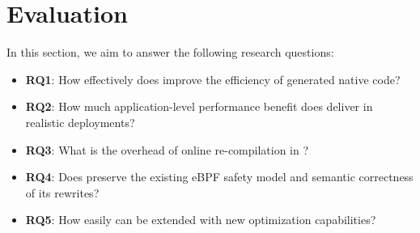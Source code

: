 










\section{Evaluation }
\label{sec:evaluation}

In this section, we aim to answer the following research questions:
\begin{itemize}
    \item \textbf{RQ1}: How effectively does \tool improve the efficiency of generated native code?
    \item \textbf{RQ2}: How much application-level performance benefit does \tool deliver in realistic deployments?
    \item \textbf{RQ3}: What is the overhead of online re-compilation in \tool?
    \item \textbf{RQ4}: Does \tool preserve the existing eBPF safety model and semantic correctness of its rewrites?
    \item \textbf{RQ5}: How easily can \tool be extended with new optimization capabilities?
\end{itemize}

